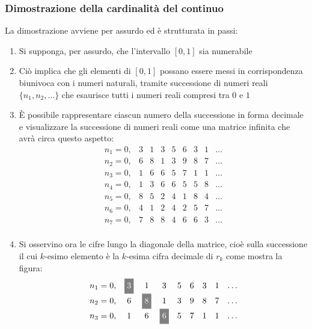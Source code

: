 \documentclass[italian, 10pt]{article}
\begin{document}
\subsubsection{Dimostrazione della cardinalità del continuo}

La dimostrazione avviene per assurdo ed è strutturata in passi:

\begin{enumerate}
  \item Si supponga, per assurdo, che l'intervallo \([0, 1]\) sia numerabile
  \item Ciò implica che gli elementi di \([0, 1]\) possano essere messi in corrispondenza biunivoca con i numeri naturali, tramite successione di numeri reali \(\{n_1, n_2, \ldots\}\) che esaurisce tutti i numeri reali compresi tra \(0\) e \(1\)
  \item È possibile rappresentare ciascun numero della successione in forma decimale e visualizzare la successione di numeri reali come una matrice infinita che avrà circa questo aspetto:
        \[\begin{matrix}
            n_1 = 0, & 3 & 1 & 3 & 5 & 6 & 3 & 1 & \ldots \\
            n_2 = 0, & 6 & 8 & 1 & 3 & 9 & 8 & 7 & \ldots \\
            n_3 = 0, & 1 & 6 & 6 & 5 & 7 & 1 & 1 & \ldots \\
            n_4 = 0, & 1 & 3 & 6 & 6 & 5 & 5 & 8 & \ldots \\
            n_5 = 0, & 8 & 5 & 2 & 4 & 1 & 8 & 4 & \ldots \\
            n_6 = 0, & 4 & 1 & 2 & 4 & 2 & 5 & 7 & \ldots \\
            n_7 = 0, & 7 & 8 & 8 & 4 & 6 & 6 & 3 & \ldots \\
          \end{matrix}\]
  \item Si osservino ora le cifre lungo la diagonale della matrice, cioè sulla successione il cui \(k\)-esimo elemento è la \(k\)-esima cifra decimale di \(r_k\) come mostra la figura:
        \[\begin{matrix}
            n_1 = 0, & \whiteongray{3} & 1               & 3               & 5               & 6               & 3               & 1               & \ldots \\
            n_2 = 0, & 6               & \whiteongray{8} & 1               & 3               & 9               & 8               & 7               & \ldots \\
            n_3 = 0, & 1               & 6               & \whiteongray{6} & 5               & 7               & 1               & 1               & \ldots \\

\end{matrix}\]
\end{enumerate}
\end{document}

